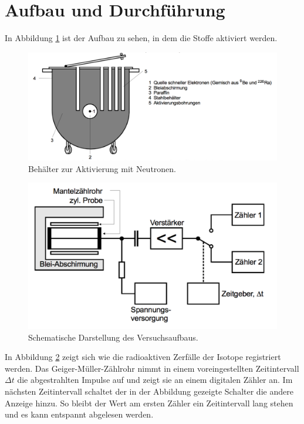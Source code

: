  \section{Aufbau und Durchführung}
\label{sec:Durchführung}

In Abbildung \ref{fig:aktivierung} ist der Aufbau zu sehen, in dem die Stoffe aktiviert
werden.

\begin{figure}[h]
  \centering
  \includegraphics[width = \textwidth]{Pics/aktivierungsbehaelter.pdf}
  \caption{Behälter zur Aktivierung mit Neutronen.\cite{anleitung}}
  \label{fig:aktivierung}
\end{figure}

\begin{figure}[h]
  \centering
  \includegraphics[width = \textwidth]{Pics/zaehleraufbau.pdf}
  \caption{Schematische Darstellung des Versuchsaufbaus.\cite{anleitung}}
  \label{fig:aufbau}
\end{figure}

In Abbildung \ref{fig:aufbau} zeigt sich wie die radioaktiven Zerfälle der Isotope
registriert werden. Das Geiger-Müller-Zählrohr nimmt in einem voreingestellten Zeitintervall
$\Delta t$ die abgestrahlten Impulse auf und zeigt sie an einem digitalen Zähler an.
Im nächsten Zeitintervall schaltet der in der Abbildung gezeigte Schalter die andere Anzeige
hinzu. So bleibt der Wert am ersten Zähler ein Zeitintervall lang stehen und es kann
entspannt abgelesen werden.

